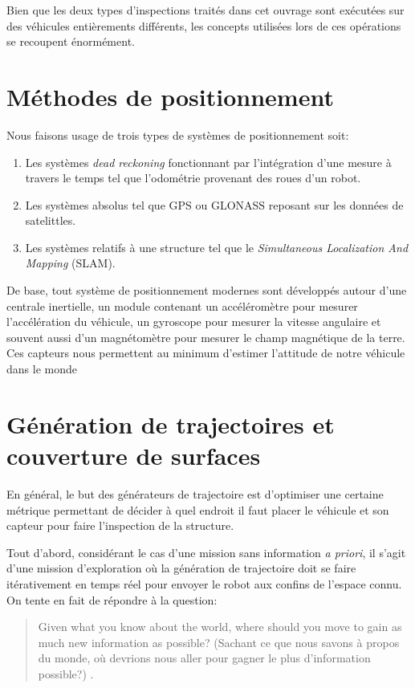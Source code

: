 \label{sec:RevLitt}

Bien que les deux types d'inspections traités dans cet ouvrage sont exécutées sur des véhicules entièrements différents, les concepts utilisées lors de ces opérations se recoupent énormément.

\section{Méthodes de positionnement}

Nous faisons usage de trois types de systèmes de positionnement soit:
\begin{enumerate}
  \item Les systèmes \textit{dead reckoning} fonctionnant par l'intégration d'une mesure à travers le temps tel que l'odométrie provenant des roues d'un robot.
  \item Les systèmes absolus tel que GPS ou GLONASS reposant sur les données de satelittles.
  \item Les systèmes relatifs à une structure tel que le \textit{Simultaneous Localization And Mapping} (SLAM).
\end{enumerate}

De base, tout système de positionnement modernes sont développés autour d'une centrale inertielle, un module contenant un accéléromètre pour mesurer l'accélération du véhicule, un gyroscope pour mesurer la vitesse angulaire et souvent aussi d'un magnétomètre pour mesurer le champ magnétique de la terre. Ces capteurs nous permettent au minimum d'estimer l'attitude de notre véhicule dans le monde

\section{Génération de trajectoires et couverture de surfaces}

En général, le but des générateurs de trajectoire est d'optimiser une certaine métrique permettant de décider à quel endroit il faut placer le véhicule et son capteur pour faire l'inspection de la structure.

Tout d'abord, considérant le cas d'une mission sans information \textit{a priori}, il s'agit d'une mission d'exploration où la génération de trajectoire doit se faire itérativement en temps réel pour envoyer le robot aux confins de l'espace connu. On tente en fait de répondre à la question:

\begin{quote}
  Given what you know about the world, where should you move to gain as much new information as possible? (Sachant ce que nous savons à propos du monde, où devrions nous aller pour gagner le plus d'information possible?) \citep{Yamauchi1997}.
\end{quote}


